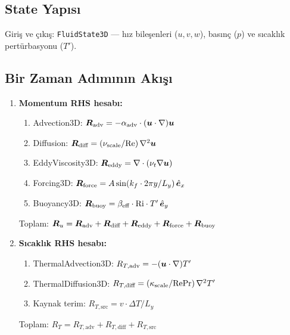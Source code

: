 \subsection{State Yapısı}

Giriş ve çıkış: \texttt{FluidState3D} --- hız bileşenleri ($u, v, w$), basınç ($p$) ve sıcaklık pertürbasyonu ($T'$).

\subsection{Bir Zaman Adımının Akışı}

\begin{enumerate}
    \item \textbf{Momentum RHS hesabı:}
    \begin{enumerate}
        \item Advection3D: $\bm{R}_{\text{adv}} = -\alpha_{\text{adv}} \cdot (\bm{u} \cdot \nabla)\bm{u}$
        \item Diffusion: $\bm{R}_{\text{diff}} = (\nu_{\text{scale}} / \mathrm{Re}) \, \nabla^2 \bm{u}$
        \item EddyViscosity3D: $\bm{R}_{\text{eddy}} = \nabla \cdot(\nu_t \nabla \bm{u})$
        \item Forcing3D: $\bm{R}_{\text{force}} = A \sin(k_f \cdot 2\pi y / L_y) \, \hat{\bm{e}}_x$
        \item Buoyancy3D: $\bm{R}_{\text{buoy}} = \beta_{\text{eff}} \cdot \mathrm{Ri} \cdot T' \, \hat{\bm{e}}_y$
    \end{enumerate}
    Toplam: $\bm{R}_u = \bm{R}_{\text{adv}} + \bm{R}_{\text{diff}} + \bm{R}_{\text{eddy}} + \bm{R}_{\text{force}} + \bm{R}_{\text{buoy}}$

    \item \textbf{Sıcaklık RHS hesabı:}
    \begin{enumerate}
        \item ThermalAdvection3D: $R_{T,\text{adv}} = -(\bm{u} \cdot \nabla)T'$
        \item ThermalDiffusion3D: $R_{T,\text{diff}} = (\kappa_{\text{scale}} / \mathrm{Re}\mathrm{Pr}) \, \nabla^2 T'$
        \item Kaynak terim: $R_{T,\text{src}} = v \cdot \Delta T / L_y$
    \end{enumerate}
    Toplam: $R_T = R_{T,\text{adv}} + R_{T,\text{diff}} + R_{T,\text{src}}$


\end{enumerate}
